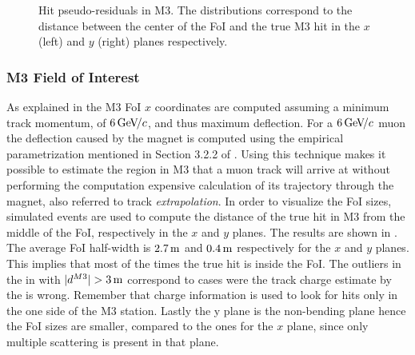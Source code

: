 \begin{figure}[t]
  \centering
  \begin{subfigure}{0.5\textwidth}
    \raggedright
    \scalebox{.6}{}
    \caption{}
    \label{mvTTm_res_x}
  \end{subfigure}%
  \hfill%
  \begin{subfigure}{0.5\textwidth}
    \raggedleft
    \scalebox{.6}{}
    \caption{}
    \label{mvm_res_y}
  \end{subfigure}
  \caption{Hit pseudo-residuals in M3. The distributions correspond to the distance between the center of the FoI and the true M3 hit
           in the $x$ (left) and $y$ (right) planes respectively.}
 \label{mvm_res}
\end{figure}

\subsubsection{M3 Field of Interest}
As explained in  the M3 FoI $x$ coordinates are computed assuming a minimum track momentum, of $6{\mathrm{\,Ge\kern -0.1em V\!/}c}$,
and thus maximum deflection. For a $6{\mathrm{\,Ge\kern -0.1em V\!/}c}$ muon the deflection caused by the \lhcb magnet is computed using the empirical
parametrization mentioned in Section 3.2.2 of \cite{roelThesis}. Using this technique makes it possible to estimate the region
in M3 that a muon track will arrive at without performing the computation
expensive calculation of its trajectory through the \lhcb magnet, also referred to track {\it extrapolation}. In order to visualize the FoI sizes,
simulated events are used to compute the distance of the true hit in M3 from the middle of the FoI, respectively in the $x$ and $y$ planes.
The results are shown in . The average FoI half-width is $2.7\rm \,m$ and $0.4\rm \,m$ respectively for the $x$ and $y$ planes.
This implies that most of the times the true hit is inside the FoI. The outliers in the  in with $|d^{M3}|>3\m$
correspond to cases were the track charge estimate by the \ttracker is wrong. Remember that charge information is used to
look for hits only in the one side of the M3 station. Lastly the y plane is the non-bending plane hence the FoI sizes
are smaller, compared to the ones for the $x$ plane, since only multiple scattering is present in that plane.

